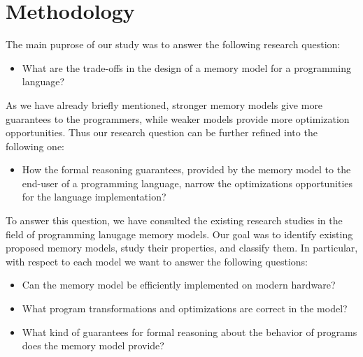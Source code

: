 \section{Methodology}
\label{sec:methodology}

The main puprose of our study was to answer the following research question:

\begin{itemize}
  \item What are the trade-offs in the design of a memory model for a programming language?
\end{itemize}

As we have already briefly mentioned, stronger memory models 
give more guarantees to the programmers, while weaker models 
provide more optimization opportunities. 
Thus our research question can be further refined into the following one:

\begin{itemize}
  \item How the formal reasoning guarantees, provided by the memory model 
    to the end-user of a programming language, narrow the 
    optimizations opportunities for the language implementation?
\end{itemize}

To answer this question, we have consulted the existing research studies 
in the field of programming lanugage memory models.
Our goal was to identify existing proposed memory models, 
study their properties, and classify them.
In particular, with respect to each model we want to answer the following questions:

\begin{itemize}
  
  \item Can the memory model be efficiently implemented on modern hardware? 

  \item What program transformations and optimizations are correct in the model? 

  \item What kind of guarantees for formal reasoning about the behavior 
    of programs does the memory model provide?
  
\end{itemize}

